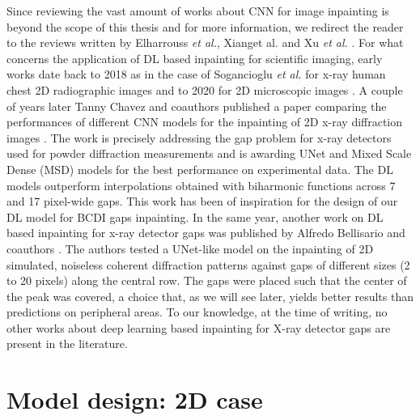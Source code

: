Since reviewing the vast amount of works about CNN for image inpainting is beyond the scope of this thesis and for more 
information, we redirect the reader to the reviews written by Elharrouss \textit{et al.}, Xiang{et al.} and  Xu 
\textit{et al.} \cite{reviewInpainting2021,DL_InpaintingReveiw2023_0, reviewInpaintingDL2023}. For what concerns the application of DL based 
inpainting for scientific imaging, early works date back to 2018 as in the case of Sogancioglu \textit{et al.} for x-ray 
human chest 2D radiographic images \cite{sogancioglu2018chestxrayinpaintingdeep} and to 2020 for 2D microscopic images \cite{microscopic_inpainting_2020}.
A couple of years later Tanny Chavez and coauthors published a paper comparing the performances of different CNN models 
for the inpainting of 2D x-ray diffraction images \cite{chavez_comparison_2022}. The work is precisely addressing the 
gap problem for x-ray detectors used for powder diffraction measurements and is awarding UNet and Mixed Scale Dense (MSD) 
models for the best performance on experimental data. The DL models outperform interpolations obtained with biharmonic functions
across 7 and 17 pixel-wide gaps. This work has been of inspiration for the design of our DL model for BCDI gaps inpainting.
In the same year, another work on DL based inpainting for x-ray detector gaps was published by Alfredo Bellisario 
and coauthors \cite{bellisario_noise_2022}. The authors tested a UNet-like model on the inpainting of 2D simulated, noiseless
coherent diffraction patterns against gaps of different sizes (2 to 20 pixels) along the central row. The gaps were 
placed such that the center of the peak was covered, a choice that, as we will see later, yields better results than 
predictions on peripheral areas. To our knowledge, at the time of writing, no other works about deep learning based inpainting
for X-ray detector gaps are present in the literature. \\


\section{Model design: 2D case}\label{sec:model}

